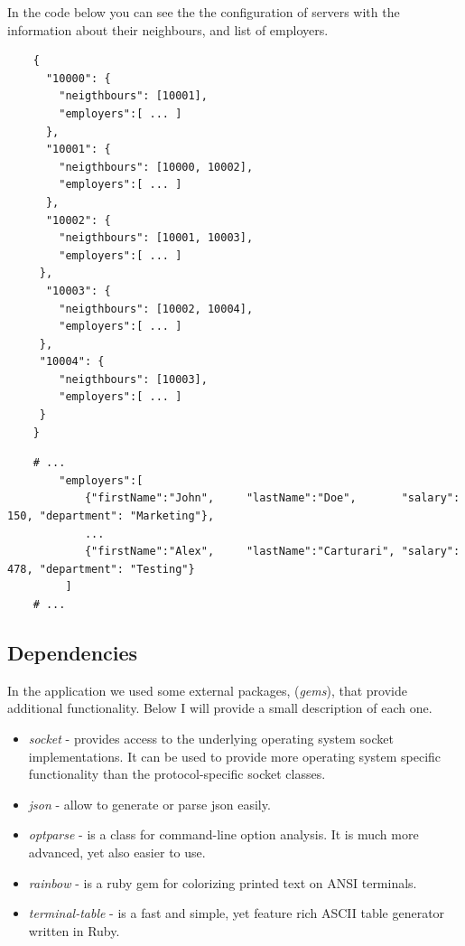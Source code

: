 \documentclass[12pt]{article}
\begin{document}
    In the code below you can see the the configuration of servers with the information about their neighbours, and list of employers.

    \newpage

    \begin{lstlisting}
    {
      "10000": {
        "neigthbours": [10001],
        "employers":[ ... ]
      },
      "10001": {
        "neigthbours": [10000, 10002],
        "employers":[ ... ]
      },
      "10002": {
        "neigthbours": [10001, 10003],
        "employers":[ ... ]
     },
      "10003": {
        "neigthbours": [10002, 10004],
        "employers":[ ... ]
     },
     "10004": {
        "neigthbours": [10003],
        "employers":[ ... ]
     }
    }
    \end{lstlisting}

    \begin{lstlisting}
    # ...
        "employers":[
            {"firstName":"John",     "lastName":"Doe",       "salary": 150, "department": "Marketing"},
            ...
            {"firstName":"Alex",     "lastName":"Carturari", "salary": 478, "department": "Testing"}
         ]
    # ...
    \end{lstlisting}

    \subsection{Dependencies}

    In the application we used some external packages, (\textit{gems}), that provide
    additional functionality. Below I will provide a small description of each one.

    \begin{itemize}
      \renewcommand{\labelitemi}{$\circ$}
      \item \textit{socket} - provides access to the underlying operating system socket implementations. It can be used to provide more operating system specific functionality than the protocol-specific socket classes.
      \item \textit{json} - allow to generate or parse json easily.
      \item \textit{optparse} -  is a class for command-line option analysis. It is much more advanced, yet also easier to use.
      \item \textit{rainbow} - is a ruby gem for colorizing printed text on ANSI terminals.
      \item \textit{terminal-table} -  is a fast and simple, yet feature rich ASCII table generator written in Ruby.
    \end{itemize}
\end{document}
